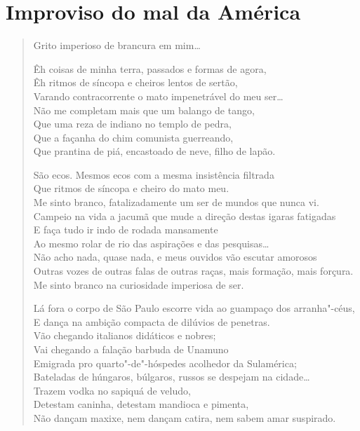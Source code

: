 {\chapter[Improviso do mal da América]{Improviso do mal da América }




\begin{verse}
Grito imperioso de brancura em mim\ldots{}

Êh coisas de minha terra, passados e formas de agora,\\
Êh ritmos de síncopa e cheiros lentos de sertão,\\
Varando contracorrente o mato impenetrável do meu ser\ldots{}\\
Não me completam mais que um balango de tango,\\
Que uma reza de indiano no templo de pedra,\\
Que a façanha do chim comunista guerreando,\\
Que prantina de piá, encastoado de neve, filho de lapão.

São ecos. Mesmos ecos com a mesma insistência filtrada\\
Que ritmos de síncopa e cheiro do mato meu.\\
Me sinto branco, fatalizadamente um ser de mundos que nunca vi.\\
Campeio na vida a jacumã que mude a direção destas igaras fatigadas\\
E faça tudo ir indo de rodada mansamente\\
Ao mesmo rolar de rio das aspirações e das pesquisas\ldots{}\\
Não acho nada, quase nada, e meus ouvidos vão escutar amorosos\\
Outras vozes de outras falas de outras raças, mais formação, mais forçura.\\
Me sinto branco na curiosidade imperiosa de ser.

Lá fora o corpo de São Paulo escorre vida ao guampaço dos arranha"-céus,\\
E dança na ambição compacta de dilúvios de penetras.\\
Vão chegando italianos didáticos e nobres;\\
Vai chegando a falação barbuda de Unamuno\\
Emigrada pro quarto"-de"-hóspedes acolhedor da Sulamérica;\\
Bateladas de húngaros, búlgaros, russos se despejam na cidade\ldots{}\\
Trazem vodka no sapiquá de veludo,\\
Detestam caninha, detestam mandioca e pimenta,\\
Não dançam maxixe, nem dançam catira, nem sabem amar suspirado.


\end{verse}}
